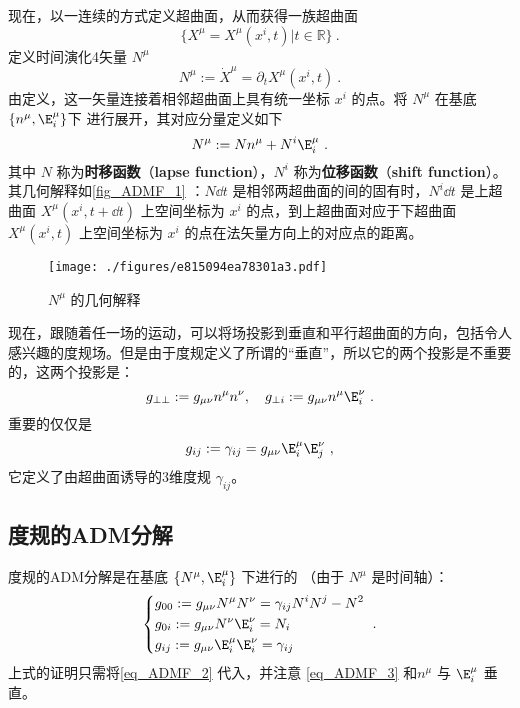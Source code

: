 现在，以一连续的方式定义超曲面，从而获得一族超曲面 
\begin{equation}
\{{X^\mu}= X^\mu(x^i,t)|t\in\mathbb R\}~.
\end{equation}
定义时间演化4矢量 $N^\mu$
\begin{equation}
N^\mu:=\dot{X}^\mu=\partial_t  X^\mu(x^i,t)~.
\end{equation}
由定义，这一矢量连接着相邻超曲面上具有统一坐标 $x^i$ 的点。将 $N^\mu$ 在基底 $\{n^\mu,\E^\mu_i\}$下 进行展开，其对应分量定义如下
\begin{equation}\label{eq_ADMF_2}
N^\mu:=Nn^\mu+N^i\E^\mu_i~.
\end{equation}
其中 $N$ 称为\textbf{时移函数}（\textbf{lapse function}），$N^i$ 称为\textbf{位移函数}（\textbf{shift function}）。其几何解释如\autoref{fig_ADMF_1} ：$N\dd t$ 是相邻两超曲面的间的固有时，$N^i\dd t$ 是上超曲面 $X^\mu(x^i,t+\dd t)$ 上空间坐标为 $x^i$ 的点，到上超曲面对应于下超曲面 $X^\mu(x^i,t)$ 上空间坐标为 $x^i$ 的点在法矢量方向上的对应点的距离。
\begin{figure}[ht]
\centering
\texttt{[image: ./figures/e815094ea78301a3.pdf]}
\caption{$N^\mu$ 的几何解释} \label{fig_ADMF_1}
\end{figure}

现在，跟随着任一场的运动，可以将场投影到垂直和平行超曲面的方向，包括令人感兴趣的度规场。但是由于度规定义了所谓的“垂直”，所以它的两个投影是不重要的，这两个投影是：
\begin{equation}
g_{\perp\perp}:=g_{\mu\nu}n^{\mu}n^{\nu},\quad g_{\perp i}:=g_{\mu\nu}n^{\mu}\E^{\nu}_i~.
\end{equation}
重要的仅仅是
\begin{equation}\label{eq_ADMF_3}
g_{ij}:=\gamma_{ij}=g_{\mu\nu}\E^{\mu}_i\E^{\nu}_j~,
\end{equation}
它定义了由超曲面诱导的3维度规 $\gamma_{ij}$。
\subsection{度规的ADM分解}
度规的ADM分解是在基底 $\{N^{\mu},\E^{\mu}_i\}$ 下进行的 （由于 $N^{\mu}$ 是时间轴）：
\begin{equation}
\left\{\begin{aligned}
&g_{00}:=g_{\mu\nu}N^{\mu}N^{\nu}=\gamma_{ij}N^iN^j-N^2\\
&g_{0i}:=g_{\mu\nu}N^{\nu}\E^{\nu}_i=N_i\\
&g_{ij}:=g_{\mu\nu}\E^{\mu}_i\E^{\nu}_i=\gamma_{ij}
\end{aligned}\right.~.
\end{equation}
上式的证明只需将\autoref{eq_ADMF_2} 代入，并注意 \autoref{eq_ADMF_3} 和$n^\mu$ 与 $\E^{\mu}_i$ 垂直。

